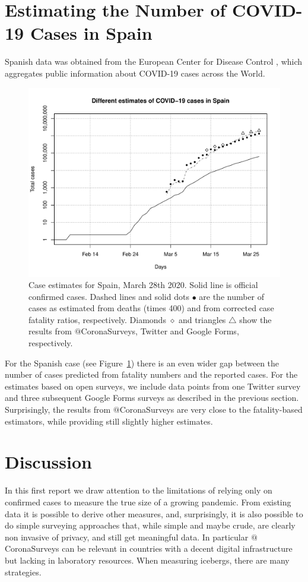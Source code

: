 \documentclass{article}
\begin{document}
\section{Estimating the Number of COVID-19 Cases in Spain}

Spanish data was obtained from the European Center for Disease Control \cite{ECDC}, which aggregates public information about COVID-19 cases across the World. 

\begin{figure}
\begin{center}
\includegraphics[width=0.9\linewidth]{EstSPMar28.pdf}
\end{center}
\caption{Case estimates for Spain, March 28th 2020. Solid line is official confirmed cases. Dashed lines and solid dots $\bullet$ are the number of cases as estimated from deaths (times 400) and from corrected case fatality ratios, respectively. Diamonds $\diamond$ and triangles  $\triangle$ show the results from $@$CoronaSurveys, Twitter and Google Forms, respectively.}
\label{sp}
\end{figure}

For the Spanish case (see Figure~\ref{sp}) there is an even wider gap between the number of cases predicted from fatality numbers and the reported cases. For the estimates based on open surveys, we include data points from one Twitter survey and three subsequent Google Forms surveys as described in the previous section. Surprisingly, the results from $@$CoronaSurveys are very close to the fatality-based estimators, while providing still slightly higher estimates. 

\section{Discussion}

In this first report we draw attention to the limitations of relying only on confirmed cases to measure the true size of a growing pandemic. From existing data it is possible to derive other measures, and, surprisingly, it is also possible to do simple surveying approaches that, while simple and maybe crude, are clearly non invasive of privacy, and still get meaningful data. In particular  $@$CoronaSurveys can be relevant in countries with a decent digital infrastructure but lacking in laboratory resources. When measuring icebergs,  there are many strategies. 



\end{document}
